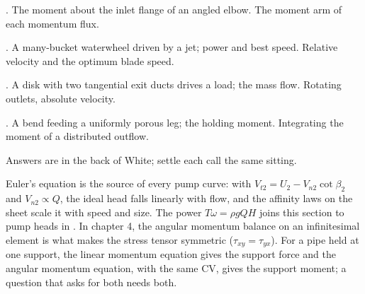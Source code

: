 \begin{ladder}
\item {}. The moment about the inlet flange of an angled elbow. The moment arm of each momentum flux.
\item {}. A many-bucket waterwheel driven by a jet; power and best speed. Relative velocity and the optimum blade speed.
\item {}. A disk with two tangential exit ducts drives a load; the mass flow. Rotating outlets, absolute velocity.
\item {}. A bend feeding a uniformly porous leg; the holding moment. Integrating the moment of a distributed outflow.
\end{ladder}
Answers are in the back of White; settle each call the same sitting.


\begin{hides}
Euler's equation is the source of every pump curve: with $V_{t2} = U_2 - V_{n2}\cot\beta_2$ and $V_{n2}\propto Q$, the ideal head falls linearly with flow, and the affinity laws on the sheet scale it with speed and size. The power $T\omega = \rho gQH$ joins this section to pump heads in . In chapter 4, the angular momentum balance on an infinitesimal element is what makes the stress tensor symmetric ($\tau_{xy} = \tau_{yx}$). For a pipe held at one support, the linear momentum equation gives the support force and the angular momentum equation, with the same CV, gives the support moment; a question that asks for both needs both.
\end{hides}

